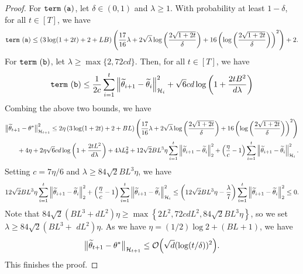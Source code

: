 \begin{proof}
    For $\mathtt{term~(a)}$, let $\delta \in (0, 1)$ and $\lambda \geq 1$. With probability at least $1-\delta$, for all $t \in [T]$, we have
    \begin{align*}
        \mathtt{term~(a)} \leq \left(3 \log (1+2t)+2+ LB\right)\left(\frac{17}{16} \lambda+2 \sqrt{\lambda} \log \left(\frac{2 \sqrt{1+2 t}}{\delta}\right)+16\left(\log \left(\frac{2 \sqrt{1+2 t}}{\delta}\right)\right)^2\right)+2 .
    \end{align*}
    For $\mathtt{term~(b)}$, let $\lambda \geq \max \{2, 72cd\}$. Then, for all $t \in [T]$, we have
    \begin{align*}
        \mathtt{term~(b)} \leq \frac{1}{2 c} \sum_{i=1}^t\Big\|\widetilde{\theta}_{i+1}-\widetilde{\theta}_{i}\Big\|_{\mathcal{H}_i}^2+\sqrt{6} c d \log \left(1+\frac{2 t B^2}{d \lambda}\right)
    \end{align*}
    Combing the above two bounds, we have
    \begin{align*}
        \big\|\thetat_{t+1}-\theta^*\big\|_{\H_{t+1}}^2  &\leq 2 \eta\left(3 \log (1+2 t)+2+BL\right)\left(\frac{17}{16} \lambda+2 \sqrt{\lambda} \log \left(\frac{2 \sqrt{1+2 t}}{\delta}\right)+16\left(\log \left(\frac{2 \sqrt{1+2 t}}{\delta}\right)\right)^2\right) \\
        &\hspace{-18mm}+4 \eta+2 \eta \sqrt{6} c d \log \left(1+\frac{2 t L^2}{d \lambda}\right)+4 \lambda L_\theta^2 +12 \sqrt{2} BL^3 \eta \sum_{i=1}^t\left\|\thetat_{i+1}-\thetat_i\right\|_2^2+\left(\frac{\eta}{c}-1\right) \sum_{i=1}^t\left\|\thetat_{i+1}-\thetat_i\right\|_{\H_i}^2 .
    \end{align*}
    Setting $c=7 \eta / 6$ and $\lambda \geq 84 \sqrt{2} BL^3 \eta$, we have
    \begin{align*}
        12 \sqrt{2} BL^3 \eta \sum_{i=1}^t\left\|\widetilde{\theta}_{i+1}-\widetilde{\theta}_i\right\|_2^2+\left(\frac{\eta}{c}-1\right) \sum_{i=1}^t\left\|\widetilde{\theta}_{i+1}-\widetilde{\theta}_i\right\|_{\mathcal{H}_i}^2 \leq \left(12 \sqrt{2} BL^3 \eta - \frac{\lambda}{7}\right) \sum_{i=1}^t\left\|\widetilde{\theta}_{i+1}-\widetilde{\theta}_i\right\|_2^2 \leq 0.
    \end{align*}
    Note that $84 \sqrt{2}\left(BL^3+d L^2\right) \eta \geq \max \left\{2 L^2, 72 c d L^2, 84 \sqrt{2} BL^3 \eta\right\}$, so we set $\lambda \geq 84 \sqrt{2}\left(BL^3+\right.$ $\left.d L^2\right) \eta$. As we have $\eta=(1 / 2) \log 2+\left(BL+1\right)$, we have
    \begin{align*}
        \big\|\widetilde{\theta}_{t+1}-\theta^*\big\|_{\mathcal{H}_{t+1}} \leq \mathcal{O} \Big(\sqrt{d}(\log (t / \delta))^2 \Big).
    \end{align*}
    This finishes the proof.
\end{proof}

